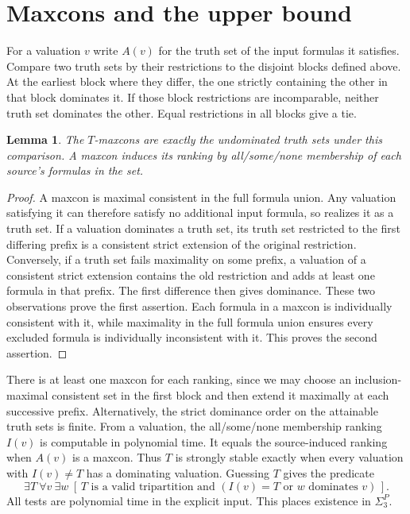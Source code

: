 \documentclass[11pt,a4paper]{amsart}
\newtheorem{lemma}[theorem]{Lemma}
\begin{document}
\section{Maxcons and the upper bound}
For a valuation $v$ write $A(v)$ for the truth set of the input formulas it satisfies. Compare two truth sets by their restrictions to the disjoint blocks defined above. At the earliest block where they differ, the one strictly containing the other in that block dominates it. If those block restrictions are incomparable, neither truth set dominates the other. Equal restrictions in all blocks give a tie.

\begin{lemma}\label{lem:truth}
The $T$-maxcons are exactly the undominated truth sets under this comparison. A maxcon induces its ranking by all/some/none membership of each source's formulas in the set.
\end{lemma}
\begin{proof}
A maxcon is maximal consistent in the full formula union. Any valuation satisfying it can therefore satisfy no additional input formula, so realizes it as a truth set. If a valuation dominates a truth set, its truth set restricted to the first differing prefix is a consistent strict extension of the original restriction. Conversely, if a truth set fails maximality on some prefix, a valuation of a consistent strict extension contains the old restriction and adds at least one formula in that prefix. The first difference then gives dominance. These two observations prove the first assertion. Each formula in a maxcon is individually consistent with it, while maximality in the full formula union ensures every excluded formula is individually inconsistent with it. This proves the second assertion.
\end{proof}

There is at least one maxcon for each ranking, since we may choose an inclusion-maximal consistent set in the first block and then extend it maximally at each successive prefix. Alternatively, the strict dominance order on the attainable truth sets is finite. From a valuation, the all/some/none membership ranking $I(v)$ is computable in polynomial time. It equals the source-induced ranking when $A(v)$ is a maxcon. Thus $T$ is strongly stable exactly when every valuation with $I(v)\ne T$ has a dominating valuation. Guessing $T$ gives the predicate
\[
  \exists T\ \forall v\ \exists w\;[\, T\text{ is a valid tripartition and }
                  (I(v)=T\text{ or }w\text{ dominates }v)\,].
\]
All tests are polynomial time in the explicit input. This places existence in $\Sigma_3^P$.
\end{document}
